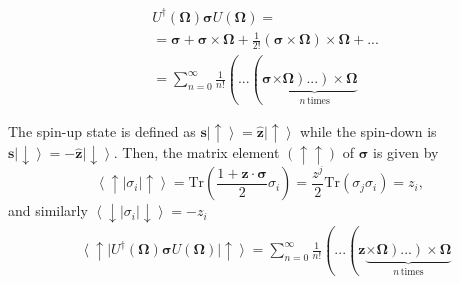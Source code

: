 \documentclass[english,aps,prd,nofootinbib,twocolumn]{revtex4-1}
\begin{document}
\begin{equation}
\begin{split}
&U^{\dagger}(\boldsymbol{\Omega})
\boldsymbol{\sigma}
U(\boldsymbol{\Omega}) =\\&= 
\boldsymbol{\sigma} + 
\boldsymbol{\sigma} \times \boldsymbol{\Omega} +
\frac{1}{2!}
(\boldsymbol{\sigma} \times \boldsymbol{\Omega})
\times \boldsymbol{\Omega} +  ...
\\ &= \sum_{n=0}^{\infty} \frac{1}{n!}
\left(\right. \! ...\left(\right. \!
\boldsymbol{\sigma} \!
\underbrace{
\times \boldsymbol{\Omega}
\! \left.\right) ... \! \left.\right)
\times \boldsymbol{\Omega} }_{n\mathrm{\,times}} 
\end{split}
\end{equation}

The spin-up state is defined as $\mathbf{s}\left|\uparrow\right\rangle=\hat{\mathbf{z}}\left|\uparrow\right\rangle$ while the spin-down is $\mathbf{s}\left|\downarrow\right\rangle=-\hat{\mathbf{z}}\left|\downarrow\right\rangle$. Then, the matrix element $(\uparrow\uparrow)$ of $\boldsymbol{\sigma}$ is given by
\begin{equation}
\left\langle\uparrow\right|
\sigma_{i}
\left|\uparrow\right\rangle = 
\mathrm{Tr}\left( 
\frac{1+\mathbf{z}\cdot\boldsymbol{\sigma}}{2}\sigma_{i}\right) = 
\frac{z^{j}}{2}\mathrm{Tr}\left(\sigma_{j}\sigma_{i}\right) = 
z_{i},
\end{equation}
and similarly $\left\langle\downarrow\right|\sigma_{i}\left|\downarrow\right\rangle = -z_{i}$
\begin{equation}
\begin{split}
&\left\langle\uparrow\right|
U^{\dagger}(\boldsymbol{\Omega})
\boldsymbol{\sigma}
U(\boldsymbol{\Omega})
\left|\uparrow\right\rangle = 
\sum_{n=0}^{\infty} \frac{1}{n!}
\left(\right. \! ...\left(\right. \!
\mathbf{z} \!
\underbrace{
\times \boldsymbol{\Omega}
\! \left.\right) ... \! \left.\right)
\times \boldsymbol{\Omega} }_{n\mathrm{\,times}} 
\end{split}
\end{equation}
\end{document}
